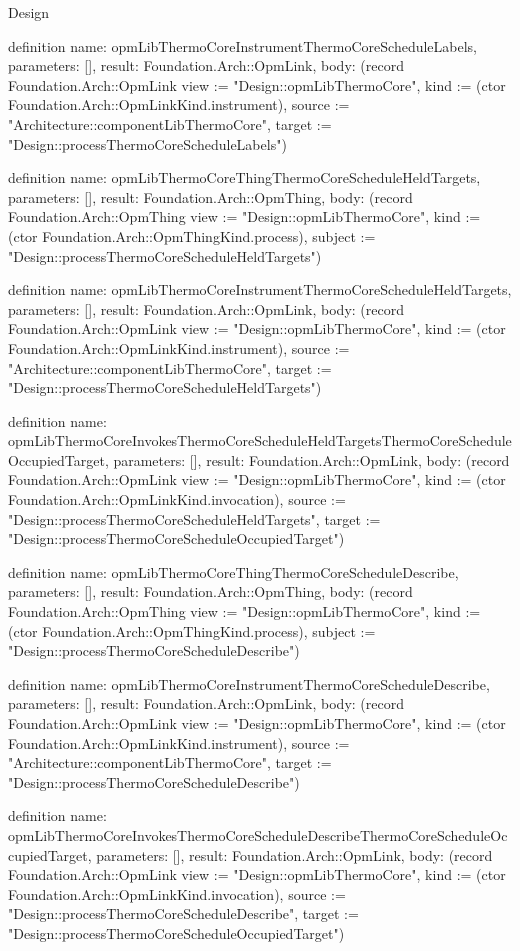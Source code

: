 \begin{lexlean}{Design}
\begin{semanticmodule}
definition{
  name: opmLibThermoCoreInstrumentThermoCoreScheduleLabels,
  parameters: [],
  result: Foundation.Arch::OpmLink,
  body: (record Foundation.Arch::OpmLink {view := "Design::opmLibThermoCore", kind := (ctor Foundation.Arch::OpmLinkKind.instrument), source := "Architecture::componentLibThermoCore", target := "Design::processThermoCoreScheduleLabels"})
}

definition{
  name: opmLibThermoCoreThingThermoCoreScheduleHeldTargets,
  parameters: [],
  result: Foundation.Arch::OpmThing,
  body: (record Foundation.Arch::OpmThing {view := "Design::opmLibThermoCore", kind := (ctor Foundation.Arch::OpmThingKind.process), subject := "Design::processThermoCoreScheduleHeldTargets"})
}

definition{
  name: opmLibThermoCoreInstrumentThermoCoreScheduleHeldTargets,
  parameters: [],
  result: Foundation.Arch::OpmLink,
  body: (record Foundation.Arch::OpmLink {view := "Design::opmLibThermoCore", kind := (ctor Foundation.Arch::OpmLinkKind.instrument), source := "Architecture::componentLibThermoCore", target := "Design::processThermoCoreScheduleHeldTargets"})
}

definition{
  name: opmLibThermoCoreInvokesThermoCoreScheduleHeldTargetsThermoCoreScheduleOccupiedTarget,
  parameters: [],
  result: Foundation.Arch::OpmLink,
  body: (record Foundation.Arch::OpmLink {view := "Design::opmLibThermoCore", kind := (ctor Foundation.Arch::OpmLinkKind.invocation), source := "Design::processThermoCoreScheduleHeldTargets", target := "Design::processThermoCoreScheduleOccupiedTarget"})
}

definition{
  name: opmLibThermoCoreThingThermoCoreScheduleDescribe,
  parameters: [],
  result: Foundation.Arch::OpmThing,
  body: (record Foundation.Arch::OpmThing {view := "Design::opmLibThermoCore", kind := (ctor Foundation.Arch::OpmThingKind.process), subject := "Design::processThermoCoreScheduleDescribe"})
}

definition{
  name: opmLibThermoCoreInstrumentThermoCoreScheduleDescribe,
  parameters: [],
  result: Foundation.Arch::OpmLink,
  body: (record Foundation.Arch::OpmLink {view := "Design::opmLibThermoCore", kind := (ctor Foundation.Arch::OpmLinkKind.instrument), source := "Architecture::componentLibThermoCore", target := "Design::processThermoCoreScheduleDescribe"})
}

definition{
  name: opmLibThermoCoreInvokesThermoCoreScheduleDescribeThermoCoreScheduleOccupiedTarget,
  parameters: [],
  result: Foundation.Arch::OpmLink,
  body: (record Foundation.Arch::OpmLink {view := "Design::opmLibThermoCore", kind := (ctor Foundation.Arch::OpmLinkKind.invocation), source := "Design::processThermoCoreScheduleDescribe", target := "Design::processThermoCoreScheduleOccupiedTarget"})
}


\end{semanticmodule}
\end{lexlean}

